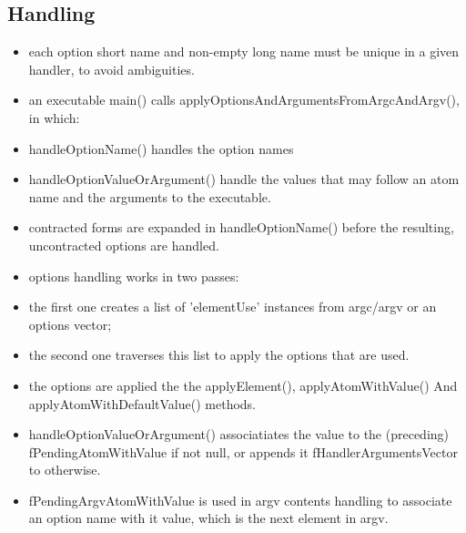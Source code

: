 \subsection{Handling}

\begin{itemize}
\item each option short name and non-empty long name must be unique in a given handler,
    to avoid ambiguities.

\item an executable main() calls applyOptionsAndArgumentsFromArgcAndArgv(), in which:
  \item handleOptionName() handles the option names
  \item handleOptionValueOrArgument() handle the values that may follow an atom name
      and the arguments to the executable.

\item contracted forms are expanded in handleOptionName() before the resulting,
    uncontracted options are handled.

\item options handling works in two passes:
    \item the first one creates a list of 'elementUse' instances from
        argc/argv or an options vector;
    \item the second one traverses this list to apply the options that are used.

\item the options are applied the the applyElement(), applyAtomWithValue() And
    applyAtomWithDefaultValue() methods.

\item handleOptionValueOrArgument() associatiates the value
    to the (preceding) fPendingAtomWithValue if not null,
    or appends it fHandlerArgumentsVector to otherwise.

\item fPendingArgvAtomWithValue is used in argv contents handling
    to associate an option name with it value, which is the next element in argv.

\end{itemize}

